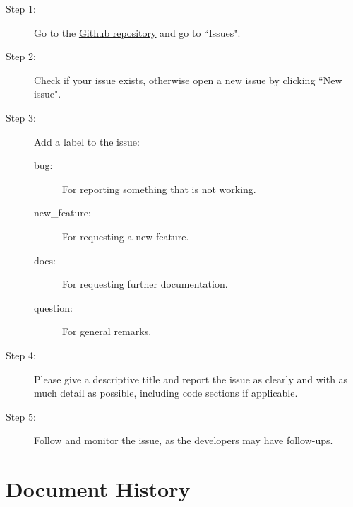 \documentclass{CSSRforAfrica}
\begin{document}
\begin{description}
    \item[Step 1:] Go to the \href{https://github.com/danielcortezbarros/peppertrace}{Github repository} and go to ``Issues".

    \item[Step 2:] Check if your issue exists, otherwise open a new issue by clicking ``New issue".

    \item[Step 3:] Add a label to the issue:
    \begin{description}
        \item[bug:] For reporting something that is not working.
        \item[new\_feature:] For requesting a new feature.
        \item[docs:] For requesting further documentation.
        \item[question:] For general remarks.
    \end{description}

    \item[Step 4:] Please give a descriptive title and report the issue as clearly and with as much detail as possible, including code sections if applicable.

    \item[Step 5:] Follow and monitor the issue, as the developers may have follow-ups.
\end{description}



\newpage
\section*{Document History}
\label{document_history}
\end{document}
